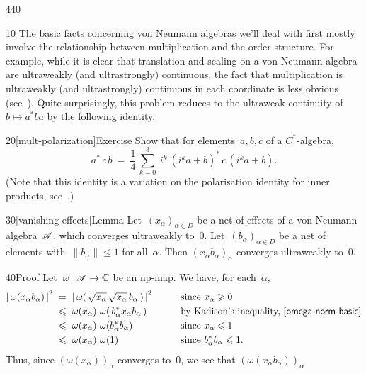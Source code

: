 \begin{parsec}{440}%
\begin{point}{10}%
The basic facts concerning von Neumann algebras
we'll deal with first mostly involve the
relationship
between
multiplication
and the order structure.
For example,
while it is clear that translation and scaling
on a von Neumann algebra
are ultraweakly (and ultrastrongly) continuous,
the fact
that multiplication is ultraweakly (and ultrastrongly)
continuous in each coordinate is
less obvious (see~).
Quite surprisingly,
this problem reduces to the ultraweak continuity
of $b\mapsto a^*ba$ by the following identity.
\end{point}
\begin{point}{20}[mult-polarization]{Exercise}%
Show that for elements~$a,b,c$ of a $C^*$-algebra,
\begin{equation*}
\textstyle
a^*\,c\,b\ =\ \frac{1}{4}\,\sum_{k=0}^3\ i^k\  (i^ka+b)^*\,c\,(i^ka+b).
\end{equation*}
(Note that this identity is a variation on the polarisation
identity for inner products,
see~.)
\end{point}
\begin{point}{30}[vanishing-effects]{Lemma}%
Let~$(x_\alpha)_{\alpha\in D}$ be 
a net of effects of a von Neumann algebra~$\mathscr{A}$,
which converges ultraweakly to~$0$.
Let~$(b_\alpha)_{\alpha\in D}$ be a 
net of elements with~$\|b_\alpha\| \leq 1$ for all~$\alpha$.
Then $(x_\alpha b_\alpha)_\alpha$ converges ultraweakly
to~$0$.
\begin{point}{40}{Proof}%
Let~$\omega\colon \mathscr{A}\to \mathbb{C}$ be an np-map.
We have, for each~$\alpha$,
\begin{alignat*}{3}
\left|\,\omega(x_\alpha b_\alpha)\,\right|^2
\ &=\ 
\left|\, \omega(\,\sqrt{x_\alpha}\,\sqrt{x_\alpha}\,b_\alpha\,)\, \right|^2
\qquad&&\text{since $x_\alpha\geq 0$}\\
\ &\leq\ 
\omega(x_\alpha)\  \omega(\,b_\alpha^* x_\alpha b_\alpha\,) 
\qquad&&\text{by Kadison's inequality, \sref{omega-norm-basic}}\\
\ &\leq\ 
\omega(x_\alpha)\ \omega(b_\alpha^* b_\alpha)
\qquad&&\text{since $x_\alpha\leq 1$}\\
\ &\leq\ 
\omega(x_\alpha)\ \omega(1)
\qquad&&\text{since $b_\alpha^*b_\alpha\leq 1$}.
\end{alignat*}
Thus,
since $(\omega(x_\alpha))_\alpha$
converges to~$0$,
we see that $(\omega(x_\alpha b_\alpha))_\alpha$

\end{point}
\end{point}
\end{parsec}
